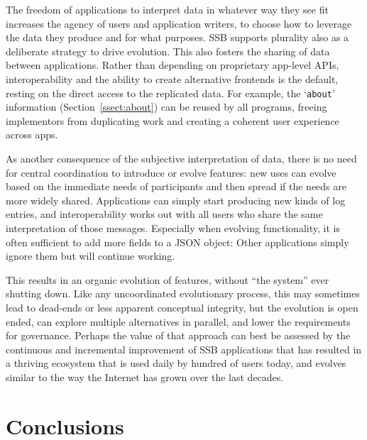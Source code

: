 \documentclass[10pt,sigconf,rewiew]{acmart}
\begin{document}

The freedom of applications to interpret data in whatever way they see fit increases the agency of users and application writers, to choose how to leverage the data they produce and for what purposes. SSB supports plurality also as a deliberate strategy to drive evolution. This also fosters the sharing of data between applications. Rather than depending on proprietary app-level APIs, interoperability and the ability to create alternative frontends is the default, resting on the direct access to the replicated data. For example, the `{\small\tt about}' information (Section~\ref{ssect:about}) can be reused by all programs, freeing implementors from duplicating work and creating a coherent user experience across apps.

As another consequence of the subjective interpretation of data, there is no need for central coordination to introduce or evolve features: new uses can evolve based on the immediate needs of participants and then spread if the needs are more widely shared. Applications can simply start producing new kinds of log entries, and interoperability works out with all users who share the same interpretation of those messages. Especially when evolving functionality, it is often sufficient to add more fields to a JSON object: Other applications simply ignore them but will continue working.

This results in an organic evolution of features, without ``the system'' ever shutting down. Like any uncoordinated evolutionary process, this may sometimes lead to dead-ends or less apparent conceptual integrity, but the evolution is open ended, can explore multiple alternatives in parallel, and lower the requirements for governance. Perhaps the value of that approach can best be assessed by the continuous and incremental improvement of SSB applications that has resulted in a thriving ecosystem that is used daily by hundred of users today, and evolves similar to the way the Internet has grown over the last decades.


\section{Conclusions}
\end{document}
